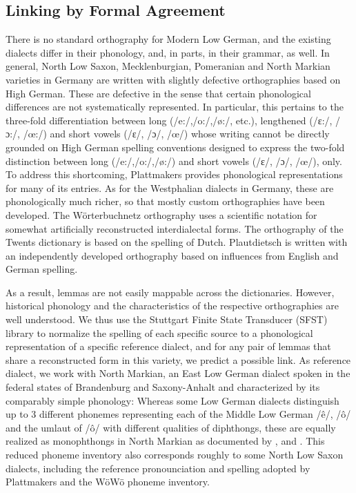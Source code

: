 \documentclass[11pt]{article}
\begin{document}
\begin{enumerate}
\section{Linking by Formal Agreement}
\label{sec-linking-by-agreement}

There is no standard orthography for Modern Low German, and the existing dialects differ in their phonology, and, in parts, in their grammar, as well.
In general, North Low Saxon, Mecklenburgian, Pomeranian and North Markian varieties in Germany are written with slightly defective orthographies based on High German. These are defective in the sense that certain phonological differences are not systematically represented. In particular, this pertains to the three-fold differentiation between long (/e:/,/o:/,/ø:/, etc.), lengthened (/ɛ:/, /ɔ:/, /œ:/) and short vowels (/ɛ/, /ɔ/, /œ/) whose writing cannot be directly grounded on High German spelling conventions designed to express the two-fold distinction between long (/e:/,/o:/,/ø:/) and short vowels (/ɛ/, /ɔ/, /œ/), only. 
To address this shortcoming, Plattmakers provides phonological representations for many of its entries. As for the Westphalian dialects in Germany, these are phonologically much richer, so that mostly custom orthographies have been developed. The Wörterbuchnetz orthography uses a scientific notation for somewhat artificially reconstructed interdialectal forms. The orthography of the Twents dictionary is based on the spelling of Dutch. Plautdietsch is written with an independently developed orthography based on influences from English and German spelling.

As a result, lemmas are not easily mappable across the dictionaries. However, historical phonology and the characteristics of the respective orthographies are well understood.
We thus use the Stuttgart Finite State Transducer (SFST) library to normalize the spelling of each specific source to a phonological representation of a specific reference dialect, and for any pair of lemmas that share a reconstructed form in this variety, we predict a possible link. 
As reference dialect, we work with North Markian, an East Low German dialect spoken in the federal states of Brandenburg and Saxony-Anhalt and characterized by its comparably simple phonology: Whereas some Low German dialects distinguish up to 3 different phonemes representing each of the Middle Low German /ê/, /ô/ and the umlaut of /ô/ with different qualities of diphthongs, these are equally realized as monophthongs in North Markian as documented by \cite{pfaff1898vocale}, \cite{mackel1905mundart} and \cite{teuchert1907mundart}. This reduced phoneme inventory also corresponds roughly to some North Low Saxon dialects, including the reference pronounciation and spelling adopted by Plattmakers and the WöWö phoneme inventory.


\end{enumerate}
\end{document}
